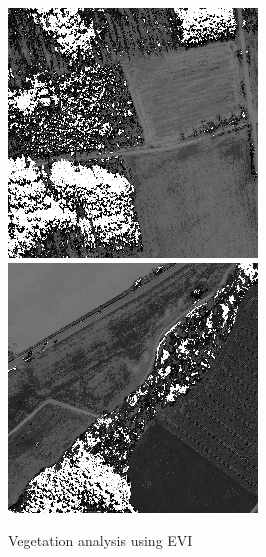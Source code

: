 \begin{figure}
    \includegraphics[width=\VegetationIndicesImageWidth]{images/vegetation/evi/4} \hfill
    \includegraphics[width=\VegetationIndicesImageWidth]{images/vegetation/evi/5}

    \caption{Vegetation analysis using EVI}
    \label{fig:vegetation_evi_examples}
\end{figure}

